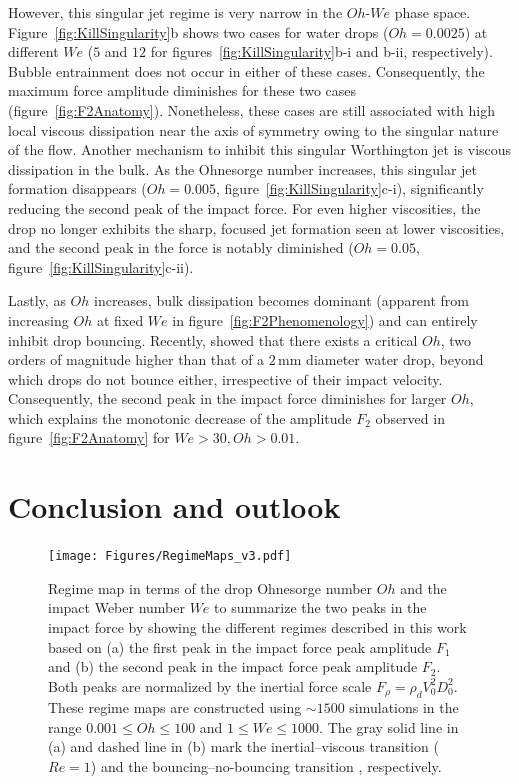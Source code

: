 \documentclass{jfm}
\begin{document}
	However, this singular jet regime is very narrow in the $Oh$-$We$ phase space. Figure~\ref{fig:KillSingularity}b shows two cases for water drops ($Oh = 0.0025$) at different $We$ ($5$ and $12$ for figures~\ref{fig:KillSingularity}b-i and b-ii, respectively). Bubble entrainment does not occur in either of these cases. Consequently, the maximum force amplitude diminishes for these two cases (figure~\ref{fig:F2Anatomy}). Nonetheless, these cases are still associated with high local viscous dissipation near the axis of symmetry owing to the singular nature of the flow. Another mechanism to inhibit this singular Worthington jet is viscous dissipation in the bulk. As the Ohnesorge number increases, this singular jet formation disappears ($Oh = 0.005$, figure~\ref{fig:KillSingularity}c-i), significantly reducing the second peak of the impact force. For even higher viscosities, the drop no longer exhibits the sharp, focused jet formation seen at lower viscosities, and the second peak in the force is notably diminished ($Oh = 0.05$, figure~\ref{fig:KillSingularity}c-ii).
	
	Lastly,  as $Oh$ increases, bulk dissipation becomes dominant (apparent from increasing $Oh$ at fixed $We$ in figure~\ref{fig:F2Phenomenology}) and can entirely inhibit drop bouncing. Recently, \citet{Jha2020, sanjay_chantelot_lohse_2023} showed that there exists a critical $Oh$, two orders of magnitude higher than that of a $2\,\si{\milli\meter}$ diameter water drop, beyond which drops do not bounce either, irrespective of their impact velocity. Consequently, the second peak in the impact force diminishes for larger $Oh$, which explains the monotonic decrease of the amplitude $F_2$ observed in figure~\ref{fig:F2Anatomy} for $We > 30, Oh > 0.01$.
	
	\section{Conclusion and outlook}\label{sec:Conclusion}
	
	\begin{figure}
		\centering
		\texttt{[image: Figures/RegimeMaps\_v3.pdf]}
		\caption{Regime map in terms of the drop Ohnesorge number $Oh$ and the impact Weber number $We$ to summarize the two peaks in the impact force by showing the different regimes described in this work based on (a) the first peak in the impact force peak amplitude $F_1$ and (b) the second peak in the impact force peak amplitude $F_2$. Both peaks are normalized by the inertial force scale $F_\rho = \rho_dV_0^2D_0^2$. These regime maps are constructed using $\sim 1500$ simulations in the range $0.001 \leq Oh \leq 100$ and $1 \leq We \leq 1000$. The gray solid line in (a) and dashed line in (b) mark the inertial--viscous transition ($Re = 1$) and the bouncing--no-bouncing transition \citep[$Oh_c = 0.53$ for $Bo = 1$, see][]{sanjay_chantelot_lohse_2023}, respectively.}
		\label{fig:RegimeMaps}
	\end{figure}
	
\end{document}
